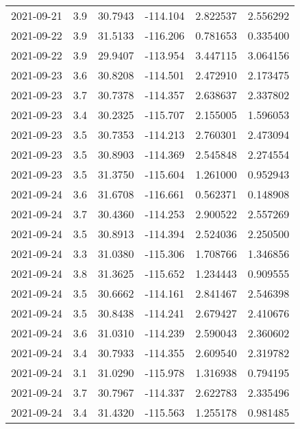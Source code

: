 \begin{tabular}{lrrrrr}
2021-09-21 &       3.9 &  30.7943 &  -114.104 &         2.822537 &         2.556292 \\
2021-09-22 &       3.9 &  31.5133 &  -116.206 &         0.781653 &         0.335400 \\
2021-09-22 &       3.9 &  29.9407 &  -113.954 &         3.447115 &         3.064156 \\
2021-09-23 &       3.6 &  30.8208 &  -114.501 &         2.472910 &         2.173475 \\
2021-09-23 &       3.7 &  30.7378 &  -114.357 &         2.638637 &         2.337802 \\
2021-09-23 &       3.4 &  30.2325 &  -115.707 &         2.155005 &         1.596053 \\
2021-09-23 &       3.5 &  30.7353 &  -114.213 &         2.760301 &         2.473094 \\
2021-09-23 &       3.5 &  30.8903 &  -114.369 &         2.545848 &         2.274554 \\
2021-09-23 &       3.5 &  31.3750 &  -115.604 &         1.261000 &         0.952943 \\
2021-09-24 &       3.6 &  31.6708 &  -116.661 &         0.562371 &         0.148908 \\
2021-09-24 &       3.7 &  30.4360 &  -114.253 &         2.900522 &         2.557269 \\
2021-09-24 &       3.5 &  30.8913 &  -114.394 &         2.524036 &         2.250500 \\
2021-09-24 &       3.3 &  31.0380 &  -115.306 &         1.708766 &         1.346856 \\
2021-09-24 &       3.8 &  31.3625 &  -115.652 &         1.234443 &         0.909555 \\
2021-09-24 &       3.5 &  30.6662 &  -114.161 &         2.841467 &         2.546398 \\
2021-09-24 &       3.5 &  30.8438 &  -114.241 &         2.679427 &         2.410676 \\
2021-09-24 &       3.6 &  31.0310 &  -114.239 &         2.590043 &         2.360602 \\
2021-09-24 &       3.4 &  30.7933 &  -114.355 &         2.609540 &         2.319782 \\
2021-09-24 &       3.1 &  31.0290 &  -115.978 &         1.316938 &         0.794195 \\
2021-09-24 &       3.7 &  30.7967 &  -114.337 &         2.622783 &         2.335496 \\
2021-09-24 &       3.4 &  31.4320 &  -115.563 &         1.255178 &         0.981485 \\

\end{tabular}
